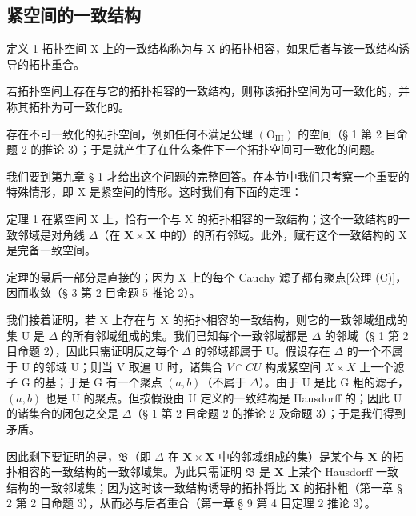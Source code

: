 \subsection{紧空间的一致结构}

定义 1 拓扑空间 X 上的一致结构称为与 X 的拓扑相容，如果后者与该一致结构诱导的拓扑重合。

若拓扑空间上存在与它的拓扑相容的一致结构，则称该拓扑空间为可一致化的，并称其拓扑为可一致化的。

存在不可一致化的拓扑空间，例如任何不满足公理 \((\mathrm{O}_{\mathrm{III}})\) 的空间（§ 1 第 2 目命题 2 的推论 3）；于是就产生了在什么条件下一个拓扑空间可一致化的问题。

我们要到第九章 § 1 才给出这个问题的完整回答。在本节中我们只考察一个重要的特殊情形，即 X 是紧空间的情形。这时我们有下面的定理：

定理 1 在紧空间 X 上，恰有一个与 X 的拓扑相容的一致结构；这个一致结构的一致邻域是对角线 \(\Delta\)（在 \(\mathbf{X} \times \mathbf{X}\) 中的）的所有邻域。此外，赋有这个一致结构的 X 是完备一致空间。

定理的最后一部分是直接的；因为 X 上的每个 Cauchy 滤子都有聚点{[}公理 (C){]}，因而收敛（§ 3 第 2 目命题 5 推论 2）。

我们接着证明，若 X 上存在与 X 的拓扑相容的一致结构，则它的一致邻域组成的集 U 是 \(\Delta\) 的所有邻域组成的集。我们已知每个一致邻域都是 \(\Delta\) 的邻域（§ 1 第 2 目命题 2），因此只需证明反之每个 \(\Delta\) 的邻域都属于 U。假设存在 \(\Delta\) 的一个不属于 U 的邻域 U；则当 V 取遍 U 时，诸集合 \(V \cap CU\) 构成紧空间 \(X \times X\) 上一个滤子 G 的基；于是 G 有一个聚点 \((a, b)\)（不属于 \(\Delta\)）。由于 U 是比 G 粗的滤子，\((a, b)\) 也是 U 的聚点。但按假设由 U 定义的一致结构是 Hausdorff 的；因此 U 的诸集合的闭包之交是 \(\Delta\)（§ 1 第 2 目命题 2 的推论 2 及命题 3）；于是我们得到矛盾。

因此剩下要证明的是，\(\mathfrak{B}\)（即 \(\Delta\) 在 \(\mathbf{X} \times \mathbf{X}\) 中的邻域组成的集）是某个与 \(\mathbf{X}\) 的拓扑相容的一致结构的一致邻域集。为此只需证明 \(\mathfrak{B}\) 是 \(\mathbf{X}\) 上某个 Hausdorff 一致结构的一致邻域集；因为这时该一致结构诱导的拓扑将比 \(\mathbf{X}\) 的拓扑粗（第一章 § 2 第 2 目命题 3），从而必与后者重合（第一章 § 9 第 4 目定理 2 推论 3）。

